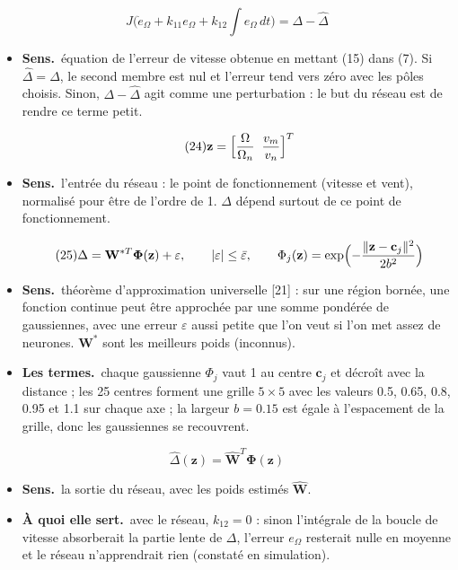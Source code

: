 \documentclass[11pt,a4paper]{article}
\newcommand{\bv}[1]{\mathbf{#1}}
\newenvironment{expl}{\begin{itemize}[leftmargin=1.2em,itemsep=2pt,topsep=2pt]}{\end{itemize}}
\newcommand{\sens}{\item \textbf{Sens.}~}
\newcommand{\termes}{\item \textbf{Les termes.}~}
\newcommand{\role}{\item \textbf{À quoi elle sert.}~}
\begin{document}
\begin{equation}\tag{23}
J\bigl(\dot e_\Omega + k_{11}e_\Omega + k_{12}\textstyle\int e_\Omega\,dt\bigr) = \Delta-\hat\Delta
\end{equation}
\begin{expl}
\sens équation de l'erreur de vitesse obtenue en mettant (15) dans (7). Si $\hat\Delta=\Delta$, le second
membre est nul et l'erreur tend vers zéro avec les pôles choisis. Sinon, $\Delta-\hat\Delta$ agit comme une
perturbation : le but du réseau est de rendre ce terme petit.
\end{expl}

\begin{equation}\tag{24}
\bv{z}=\Bigl[\frac{\Omega}{\Omega_n}\;\;\frac{v_m}{v_n}\Bigr]^T
\end{equation}
\begin{expl}
\sens l'entrée du réseau : le point de fonctionnement (vitesse et vent), normalisé pour être de l'ordre
de 1. $\Delta$ dépend surtout de ce point de fonctionnement.
\end{expl}

\begin{equation}\tag{25}
\Delta=\bv{W}^{*T}\boldsymbol\Phi(\bv{z})+\varepsilon,\qquad |\varepsilon|\le\bar\varepsilon ,\qquad
\Phi_j(\bv{z})=\exp\Bigl(-\frac{\|\bv{z}-\bv{c}_j\|^2}{2b^2}\Bigr)
\end{equation}
\begin{expl}
\sens théorème d'approximation universelle [21] : sur une région bornée, une fonction continue peut être
approchée par une somme pondérée de gaussiennes, avec une erreur $\varepsilon$ aussi petite que l'on veut si
l'on met assez de neurones. $\bv W^*$ sont les \og meilleurs\fg{} poids (inconnus).
\termes chaque gaussienne $\Phi_j$ vaut 1 au centre $\bv c_j$ et décroît avec la distance ; les 25 centres
forment une grille $5\times5$ avec les valeurs 0.5, 0.65, 0.8, 0.95 et 1.1 sur chaque axe ; la largeur
$b=0.15$ est égale à l'espacement de la grille, donc les gaussiennes se recouvrent.
\end{expl}

\begin{equation}\tag{26}
\hat\Delta(\bv{z})=\hat{\bv{W}}^T\boldsymbol\Phi(\bv{z})
\end{equation}
\begin{expl}
\sens la sortie du réseau, avec les poids estimés $\hat{\bv W}$.
\role avec le réseau, $k_{12}=0$ : sinon l'intégrale de la boucle de vitesse absorberait la partie lente de
$\Delta$, l'erreur $e_\Omega$ resterait nulle en moyenne et le réseau n'apprendrait rien (constaté en
simulation).
\end{expl}
\end{document}

